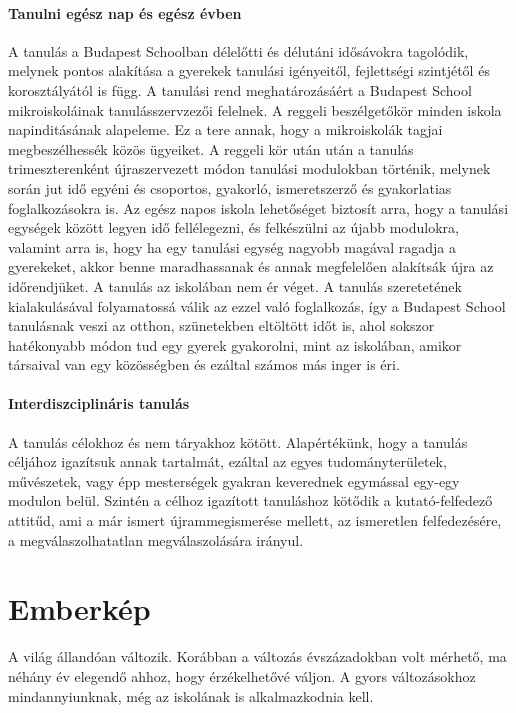 \paragraph{Tanulni egész nap és egész évben}

A tanulás a Budapest Schoolban délelőtti és délutáni idősávokra tagolódik,
melynek pontos
alakítása a gyerekek tanulási igényeitől, fejlettségi szintjétől és
korosztályától is függ. A tanulási rend meghatározásáért a Budapest
School mikroiskoláinak tanulásszervzezői felelnek. A reggeli
beszélgetőkör minden iskola napinditásának alapeleme. Ez a tere annak,
hogy a mikroiskolák tagjai megbeszélhessék közös ügyeiket. A reggeli kör
után után a tanulás trimeszterenként újraszervezett módon tanulási
modulokban történik, melynek során jut idő egyéni és csoportos,
gyakorló, ismeretszerző és gyakorlatias foglalkozásokra is. Az egész
napos iskola lehetőséget biztosít arra, hogy a tanulási egységek között
legyen idő fellélegezni, és felkészülni az újabb modulokra, valamint
arra is, hogy ha egy tanulási egység nagyobb magával ragadja a
gyerekeket, akkor benne maradhassanak és annak megfelelően alakítsák
újra az időrendjüket. A tanulás az iskolában nem ér véget. A tanulás
szeretetének kialakulásával folyamatossá válik az ezzel való foglalkozás, így a
Budapest School tanulásnak veszi az otthon, szünetekben eltöltött időt is, ahol
sokszor hatékonyabb módon tud egy gyerek gyakorolni, mint az iskolában, amikor
társaival van egy közösségben és ezáltal számos más inger is éri.

\paragraph{Interdiszciplináris tanulás}

A tanulás célokhoz és nem táryakhoz kötött. Alapértékünk, hogy a tanulás
céljához igazítsuk annak tartalmát, ezáltal az egyes tudományterületek,
művészetek, vagy épp mesterségek gyakran keverednek egymással egy-egy modulon
belül. Szintén a célhoz igazított tanuláshoz kötődik a kutató-felfedező
attitűd, ami a már ismert újrammegismerése mellett, az ismeretlen
felfedezésére,
a megválaszolhatatlan megválaszolására irányul.

\section{Emberkép}
\label{sec:gyerekkep}

A világ állandóan változik. Korábban a változás évszázadokban volt mérhető, ma
néhány év elegendő ahhoz, hogy érzékelhetővé váljon. A gyors változásokhoz
mindannyiunknak, még az iskolának is alkalmazkodnia kell.

